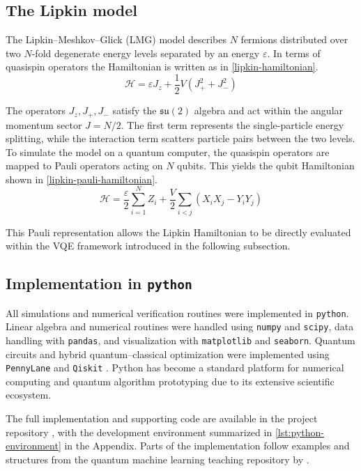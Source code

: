 \subsection{The Lipkin model}

The Lipkin--Meshkov--Glick (LMG) model describes $N$ fermions distributed over two $N$-fold degenerate energy levels separated by an energy $\varepsilon$. In terms of quasispin operators the Hamiltonian is written as in \cref{lipkin-hamiltonian}.
\begin{equation}\label{lipkin-hamiltonian}
    \mathcal{H} = \varepsilon J_z + \frac{1}{2}V(J_+^2 + J_-^2)
\end{equation}

The operators $J_z, J_+, J_-$ satisfy the $\mathfrak{su}(2)$ algebra and act within the angular momentum sector $J=N/2$. The first term represents the single-particle energy splitting, while the interaction term scatters particle pairs between the two levels. To simulate the model on a quantum computer, the quasispin operators are mapped to Pauli operators acting on $N$ qubits. This yields the qubit Hamiltonian shown in \cref{lipkin-pauli-hamiltonian}.
\begin{equation}\label{lipkin-pauli-hamiltonian}
    \mathcal{H} =
    \frac{\varepsilon}{2}\sum_{i=1}^{N} Z_i
    +
    \frac{V}{2}\sum_{i<j}(X_i X_j - Y_i Y_j)
\end{equation}

This Pauli representation allows the Lipkin Hamiltonian to be directly evaluated within the VQE framework introduced in the following subsection.

\subsection{Implementation in \texttt{python}}

All simulations and numerical verification routines were implemented in \texttt{python}. Linear algebra and numerical routines were handled using \texttt{numpy} and \texttt{scipy}, data handling with \texttt{pandas}, and visualization with \texttt{matplotlib} and \texttt{seaborn}. Quantum circuits and hybrid quantum–classical optimization were implemented using \texttt{PennyLane} and \texttt{Qiskit} \parencite{numpy,pennylane,qiskit}. Python has become a standard platform for numerical computing and quantum algorithm prototyping due to its extensive scientific ecosystem. 

The full implementation and supporting code are available in the project repository \parencite{fys5419-repo}, with the development environment summarized in \cref{lst:python-environment} in the Appendix. Parts of the implementation follow examples and structures from the quantum machine learning teaching repository by \textcite{compphysics_qcml_repo}.

